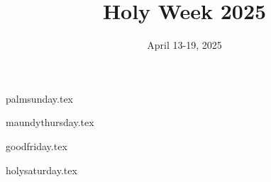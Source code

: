 \documentclass[letterpaper]{report}
\title{Holy Week 2025}
\date{April 13-19, 2025}
\begin{document}
\maketitle

{palmsunday.tex}

{maundythursday.tex}

{goodfriday.tex}

{holysaturday.tex}

\printbibliography
\end{document}
